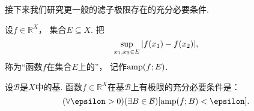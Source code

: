 接下来我们研究更一般的滤子极限存在的充分必要条件.

\begin{definition}\label{definition:极限.函数在集合上的振幅}
设\(f\in\mathbb{R}^X\)，
集合\(E \subseteq X\).
把\[
	\sup_{x_1,x_2 \in E}\abs{f(x_1)-f(x_2)},
\]
称为“函数\(f\)在集合\(E\)上的”，
记作\(\operatorname{amp}(f;E)\).
\end{definition}

\begin{theorem}
设\(\mathcal{B}\)是\(X\)中的基.
函数\(f\in\mathbb{R}^X\)在基\(\mathcal{B}\)上有极限的充分必要条件是：\[
	(\forall\epsilon>0)
	(\exists B\in\mathcal{B})
	[\amp(f;B)<\epsilon].
\]
\end{theorem}
